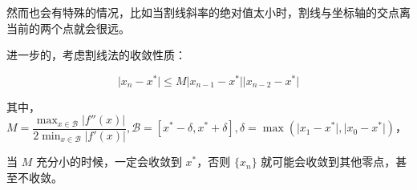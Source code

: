 \documentclass[lang=cn,a4paper,newtx,bibend=bibtex]{elegantpaper}
\begin{document}
然而也会有特殊的情况，比如当割线斜率的绝对值太小时，割线与坐标轴的交点离当前的两个点就会很远。

进一步的，考虑割线法的收敛性质：

\[
  \vert x_n - x^* \vert \le M \vert x_{n-1}-x^* \vert \vert x_{n-2} - x^*\vert
\]

其中，$M = \dfrac{\max_{x\in \mathcal{B}}\vert f''(x)\vert}{2\min_{x\in \mathcal{B}} \vert f'(x) \vert}, 
\mathcal{B} = [x^*-\delta, x^*+\delta], \delta = \max(\vert x_1 - x^*\vert, \vert x_0 - x^*\vert)$，

当 $M$ 充分小的时候，一定会收敛到 $x^*$，否则 $\{x_n\}$ 就可能会收敛到其他零点，甚至不收敛。

  
  
\nocite{*}
\printbibliography[heading=bibintoc, title=\ebibname]

\end{document}
